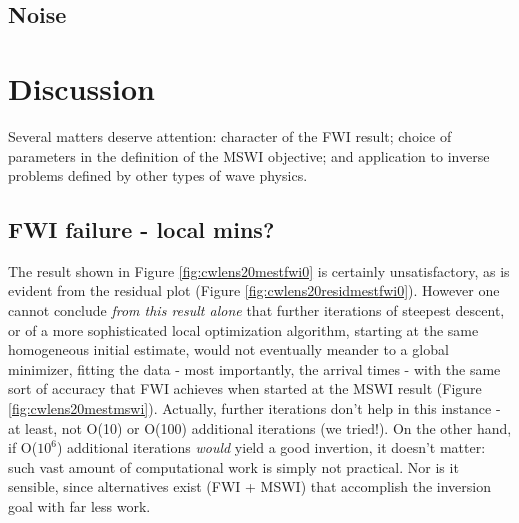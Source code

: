 



\subsection{Noise}



\section{Discussion}
Several matters deserve attention: character of the FWI result; choice of parameters in the
definition of the MSWI objective; and application to inverse problems
defined by other types of wave physics.

\subsection{FWI failure - local mins?}
The result shown in Figure \ref{fig:cwlens20mestfwi0} is certainly
unsatisfactory, as is evident from the residual plot (Figure
\ref{fig:cwlens20residmestfwi0}). However one cannot conclude {\em
  from this result alone} that further
iterations of steepest descent, or of a more sophisticated local
optimization algorithm, starting at the same homogeneous initial
estimate, would not eventually meander to a global
minimizer, fitting the data - most importantly, the arrival times -
with the same sort of accuracy that FWI achieves when started at the
MSWI result (Figure \ref{fig:cwlens20mestmswi}). Actually, further iterations don't help
in this instance - at least, not O(10) or O(100) additional
iterations (we tried!). On the other hand, if O($10^6$)
additional iterations {\em would} yield a good invertion, it doesn't matter: such vast amount of computational
work is simply not practical. Nor is it sensible, since alternatives
exist (FWI + MSWI) that accomplish the inversion goal with far less
work.

